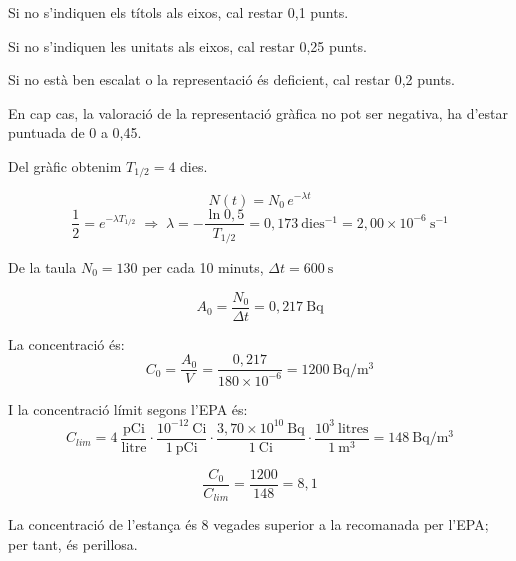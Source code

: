 \begin{solapartat}

Si no s'indiquen els títols als eixos, cal restar 0,1 punts.

Si no s'indiquen les unitats als eixos, cal restar 0,25 punts.

Si no està ben escalat o la representació és deficient, cal restar 0,2 punts.

En cap cas, la valoració de la representació gràfica no pot ser negativa, ha d'estar puntuada de 0 a 0,45.

 Del gràfic obtenim $T_{1/2} = 4$ dies.

\[ N(t) = N_0\,e^{-\lambda t} \]
\[ \frac{1}{2} = e^{-\lambda T_{1/2}} \;\Rightarrow\; \lambda = -\frac{\ln 0,5}{T_{1/2}} = 0,173\ \mathrm{dies^{-1}} = 2,00\times 10^{-6}\ \mathrm{s^{-1}} \]
\end{solapartat}

\begin{solapartat}
 De la taula $N_0 = 130$ per cada 10 minuts, $\Delta t = 600\ \mathrm{s}$

\[ A_0 = \frac{N_0}{\Delta t} = 0,217\ \mathrm{Bq} \]

 La concentració és:
\[ C_0 = \frac{A_0}{V} = \frac{0,217}{180\times 10^{-6}} = 1200\ \mathrm{Bq/m^3} \]

 I la concentració límit segons l'EPA és:
\[ C_{lim} = 4\ \frac{\mathrm{pCi}}{\mathrm{litre}}\cdot\frac{10^{-12}\ \mathrm{Ci}}{1\ \mathrm{pCi}}\cdot\frac{3,70\times 10^{10}\ \mathrm{Bq}}{1\ \mathrm{Ci}}\cdot\frac{10^{3}\ \mathrm{litres}}{1\ \mathrm{m^3}} = 148\ \mathrm{Bq/m^3} \]

\[ \frac{C_0}{C_{lim}} = \frac{1200}{148} = 8,1 \]

La concentració de l'estança és 8 vegades superior a la recomanada per l'EPA; per tant, és perillosa.
\end{solapartat}
